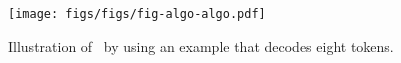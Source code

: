 \begin{figure}[ht]
\vskip -0.1in
\begin{center}
\centerline{\texttt{[image: figs/figs/fig-algo-algo.pdf]}}
\caption{Illustration of \algo\ by using an example that decodes eight tokens.}
\label{fig-algo-algo}
\end{center}
\vskip -0.3in
\end{figure}